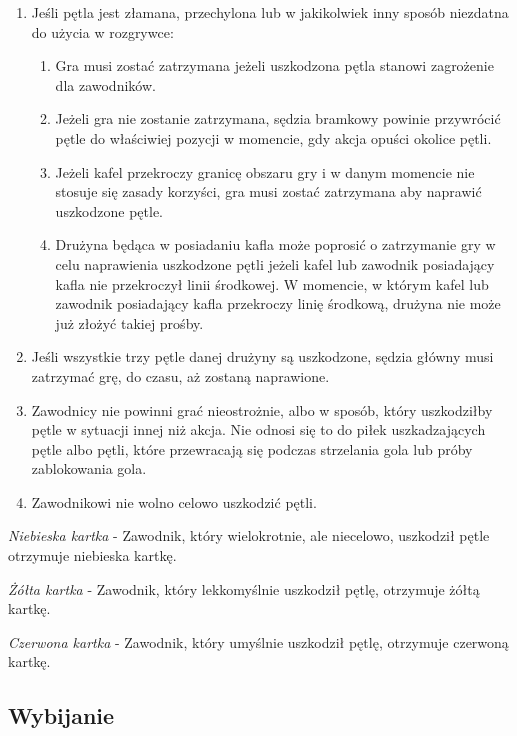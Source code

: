 \documentclass[12pt]{article}
\begin{document}
\begin{enumerate}
\item
    Jeśli pętla jest złamana, przechylona lub w jakikolwiek inny sposób
  niezdatna do użycia w rozgrywce:
  
  \begin{enumerate}
  \item
        Gra musi zostać zatrzymana jeżeli uszkodzona pętla stanowi
    zagrożenie dla zawodników.
      \item
        Jeżeli gra nie zostanie zatrzymana, sędzia bramkowy powinie
    przywrócić pętle do właściwiej pozycji w momencie, gdy akcja opuści
    okolice pętli.
      \item
        Jeżeli kafel przekroczy granicę obszaru gry i w danym momencie nie
    stosuje się zasady korzyści, gra musi zostać zatrzymana aby naprawić
    uszkodzone pętle.
      \item
        Drużyna będąca w posiadaniu kafla może poprosić o zatrzymanie gry w
    celu naprawienia uszkodzone pętli jeżeli kafel lub zawodnik
    posiadający kafla nie przekroczył linii środkowej. W momencie, w
    którym kafel lub zawodnik posiadający kafla przekroczy linię
    środkową, drużyna nie może już złożyć takiej prośby.
      \end{enumerate}
\item
    Jeśli wszystkie trzy pętle danej drużyny są uszkodzone, sędzia główny
  musi zatrzymać grę, do czasu, aż zostaną naprawione.
  \item
    Zawodnicy nie powinni grać nieostrożnie, albo w sposób, który
  uszkodziłby pętle w sytuacji innej niż akcja. Nie odnosi się to do
  piłek uszkadzających pętle albo pętli, które przewracają się podczas
  strzelania gola lub próby zablokowania gola.
  \item
    Zawodnikowi nie wolno celowo uszkodzić pętli.
  \end{enumerate}

\emph{Niebieska kartka} - Zawodnik, który wielokrotnie, ale niecelowo,
uszkodził pętle otrzymuje niebieska kartkę.

\emph{Żółta kartka} - Zawodnik, który lekkomyślnie uszkodził pętlę,
otrzymuje żółtą kartkę.

\emph{Czerwona kartka} - Zawodnik, który umyślnie uszkodził
pętlę, otrzymuje czerwoną kartkę.

\subsection{Wybijanie}
\end{document}
